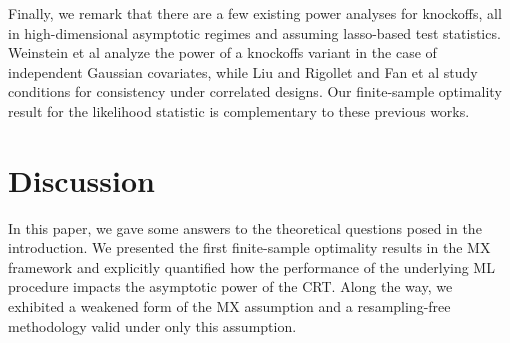 \documentclass[12pt]{article}
\theoremstyle{definition}
\theoremstyle{remark}
\newcommand{\srx}{X}
\newcommand{\srz}{Z}
\newcommand{\srxk}{\widetilde X}
\newcommand{\sry}{Y}
\begin{document}
Finally, we remark that there are a few existing power analyses for knockoffs, all in high-dimensional asymptotic regimes and assuming lasso-based test statistics. Weinstein et al \cite{Weinstein2017} analyze the power of a knockoffs variant in the case of independent Gaussian covariates, while Liu and Rigollet \cite{Liu2019} and Fan et al \cite{Fan2020} study conditions for consistency under correlated designs. Our finite-sample optimality result for the likelihood statistic is complementary to these previous works.




\section{Discussion}
\label{sec:discussion}

In this paper, we gave some answers to the theoretical questions posed in the introduction. We presented the first finite-sample optimality results in the MX framework and explicitly quantified how the performance of the underlying ML procedure impacts the asymptotic power of the CRT. Along the way, we exhibited a weakened form of the MX assumption and a resampling-free methodology valid under only this assumption.
\end{document}
